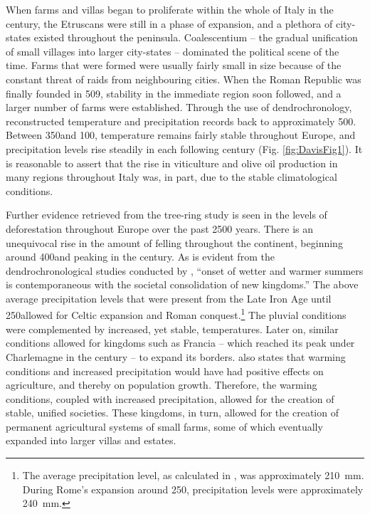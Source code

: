 When farms and villas began to proliferate within the whole of Italy in the  century\BC, the Etruscans were still in a phase of expansion, and a plethora of city-states existed throughout the peninsula. Coalescentium – the gradual unification of small villages into larger city-states – dominated the political scene of the time. Farms that were formed were usually fairly small in size because of the constant threat of raids from neighbouring cities. When the Roman Republic was finally founded in 509\BC, stability in the immediate region soon followed, and a larger number of farms were established. Through the use of dendrochronology, \textcite{Büntgen_2011a} reconstructed temperature and precipitation records back to approximately 500\BC. Between 350\BC and 100\BC, temperature remains fairly stable throughout Europe, and precipitation levels rise steadily in each following century (Fig. \ref{fig:DavisFig1}). It is reasonable to assert that the rise in viticulture and olive oil production in many regions throughout Italy was, in part, due to the stable climatological conditions.
	


Further evidence retrieved from the tree-ring study is seen in the levels of deforestation throughout Europe over the past 2500 years. There is an unequivocal rise in the amount of felling throughout the continent, beginning around 400\BC and peaking in the  century\BC. As is evident from the dendrochronological studies conducted by \textcite[580]{Büntgen_2011a}, “onset of wetter and warmer summers is contemporaneous with the societal consolidation of new kingdoms.” The above average precipitation levels that were present from the Late Iron Age until  250\AD allowed for Celtic expansion and Roman conquest.\footnote{The average precipitation level, as calculated in \textcite{Büntgen_2011b}, 
was approximately \SI{210}{\milli\metre}. During Rome’s expansion around 250\BC, 
precipitation levels were approximately \SI{240}{\milli\metre}.} The pluvial conditions were complemented by increased, yet stable, temperatures. Later on, similar conditions allowed for kingdoms such as Francia -- which reached its peak under Charlemagne in the  century – to expand its borders. \textcite[12]{Scheidel_2012} also states that warming conditions and increased precipitation would have had positive effects on agriculture, and thereby on population growth. Therefore, the warming conditions, coupled with increased precipitation, allowed for the creation of stable, unified societies. These kingdoms, in turn, allowed for the creation of permanent agricultural systems of small farms, some of which eventually expanded into larger villas and estates. 


